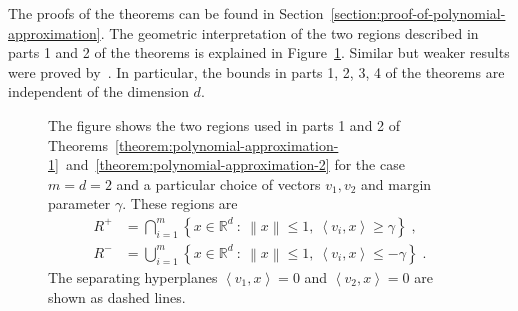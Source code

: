 \documentclass[12pt]{article}
\newcommand{\R}{\mathbb{R}}  %
\newcommand{\ip}[2]{\left\langle #1, #2 \right\rangle} %
\newcommand{\norm}[1]{\left\| #1 \right\|}  %
\begin{document}
The proofs of the theorems can be found in
Section~\ref{section:proof-of-polynomial-approximation}. The geometric
interpretation of the two regions described in parts 1 and 2 of the theorems is
explained in Figure~\ref{figure:pizza-slice}. Similar but weaker results were
proved by~\cite{Klivans-Servedio-2008}. In particular, the bounds in parts
1, 2, 3, 4 of the theorems are independent of the dimension $d$.

\begin{figure}
\begin{center}

\end{center}
\caption[]{The figure shows the two regions used in parts 1 and 2 of
Theorems~\ref{theorem:polynomial-approximation-1}~and~\ref{theorem:polynomial-approximation-2}
for the case $m=d=2$ and a particular choice of vectors $v_1, v_2$ and margin
parameter $\gamma$. These regions are
\begin{align*}
R^+ & = \displaystyle \bigcap_{i=1}^m \left\{ x \in \R^d ~:~ \norm{x} \le 1, \ \ip{v_i}{x} \ge \gamma \right\} \; , \\
R^- & = \displaystyle \bigcup_{i=1}^m \left\{ x \in \R^d ~:~ \norm{x} \le 1, \ \ip{v_i}{x} \le - \gamma \right\} \; .
\end{align*}
The separating hyperplanes $\ip{v_1}{x} = 0$ and $\ip{v_2}{x} = 0$ are shown as dashed lines.
}
\label{figure:pizza-slice}
\end{figure}
\end{document}
